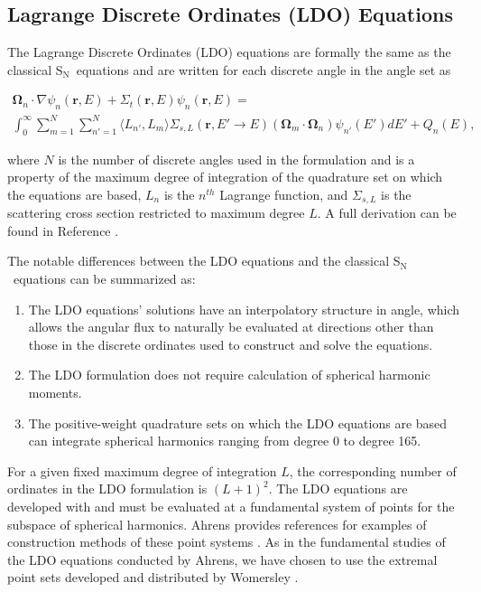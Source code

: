 \documentclass{article} %
\newcommand{\bo}{\mathbf\Omega}
\newcommand{\vecr}{\textbf{r}}
\newcommand{\sn}{S$_\mathrm{N}$}
\begin{document}
\subsection{Lagrange Discrete Ordinates (LDO) Equations}

The Lagrange Discrete Ordinates (LDO) equations are formally the same as the
classical \sn\ equations and are written for each discrete angle in the angle set as

\begin{multline}
\bo_n\cdot\nabla\psi_{n}(\vecr,E) + 
\Sigma_{t}(\vecr,E)\psi_{n}(\vecr,E) = \\
\int_0^\infty\sum_{m=1}^{N}\sum_{n'=1}^{N}\langle L_{n'},L_{m}\rangle
\Sigma_{s,L}(\vecr,E'\rightarrow E)(\bo_{m}\cdot\bo_n)\psi_{n'}(E')dE'
+ Q_{n}(E),
\end{multline}

\noindent where $N$ is the number of discrete angles used in the formulation
and is a property of the maximum degree of integration of the quadrature set
on which the equations are based, $L_n$ is the $n^{th}$ Lagrange function, and
$\Sigma_{s,L}$ is the scattering cross section restricted to maximum degree
$L$. A full derivation can be found in Reference \cite{ahrens}.

The notable differences between the LDO equations and the classical \sn\
equations can be summarized as:

\begin{enumerate}
\item{The LDO equations' solutions have an interpolatory structure in angle,
      which allows the angular flux to naturally be evaluated at directions
      other than those in the discrete ordinates used to construct and solve
      the equations.}
\item{The LDO formulation does not require calculation of spherical harmonic
      moments.}
\item{The positive-weight quadrature sets on which the LDO equations are based
      can integrate spherical harmonics ranging from degree 0 to degree 165.}
\end{enumerate}

For a given fixed maximum degree of integration $L$, the corresponding number
of ordinates in the LDO formulation is $(L+1)^2$. The LDO equations are
developed with and must be evaluated at a fundamental system of points for the
subspace of spherical harmonics. Ahrens provides references for examples of
construction methods of these point systems \cite{ahrens}. As in the 
fundamental studies of the LDO equations conducted by Ahrens, we
have chosen to use the extremal point sets developed and distributed by
Womersley \cite{wom}.
\end{document}

